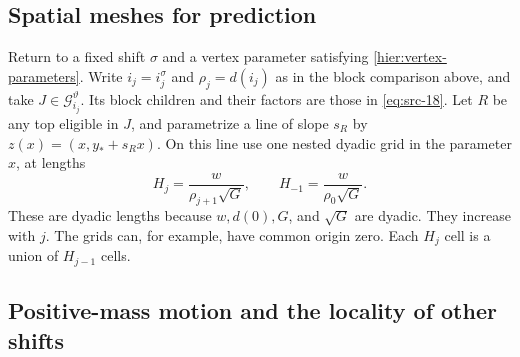 \subsection{Spatial meshes for prediction}

Return to a fixed shift $\sigma$ and a vertex parameter satisfying
\eqref{hier:vertex-parameters}.  Write $i_j=i_j^\sigma$ and
$\rho_j=d(i_j)$ as in the block comparison above, and take
$J\in\mathcal G_{i_j}^\vartheta$.  Its block children and their factors
are those in \eqref{eq:src-18}.
Let $R$ be any top eligible in $J$, and parametrize a line of slope
$s_R$ by $z(x)=(x,y_*+s_Rx)$.  On this line use one nested dyadic grid in
the parameter $x$, at lengths
\begin{equation}
 H_j=\frac{w}{\rho_{j+1}\sqrt G},
 \qquad H_{-1}=\frac{w}{\rho_0\sqrt G}.
 \label{eq:src-20}
\end{equation}
These are dyadic lengths because $w,d(0),G$, and $\sqrt G$ are dyadic.
They increase with $j$.  The grids can, for example, have common origin
zero.  Each $H_j$ cell is a union of $H_{j-1}$ cells.

\subsection{Positive-mass motion and the locality of other shifts}

